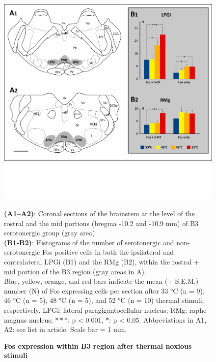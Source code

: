 \documentclass[a4paper,12pt,twoside]{report}
\begin{document}
\begin{figure}[p]

\begin{center}
 \includegraphics[width=18cm]{Article2-FIG2.jpg} 
\end{center}

\caption{\textbf{Fos expression within B3 region after thermal noxious stimuli}}

{\protect\parbox[t]{18cm}{
\begin{small}
\textbf{(A1–A2)}: Coronal sections of the brainstem at the level of the rostral and the mid portions (bregma -10.2 and -10.9 mm) of B3 serotonergic group (gray area). \\
\textbf{(B1-B2)}: Histograms of the number of serotonergic and non-serotonergic Fos positive cells in both the ipsilateral and contralateral LPGi (B1) and the RMg (B2), within the rostral + mid portion of the B3 region (gray areas in A). \\
Blue, yellow, orange, and red bars indicate the mean (+ S.E.M.) number (N) of Fos expressing cells per section after 33 °C (n = 9), 46 °C (n = 5), 48 °C (n = 5), and 52 °C (n = 10) thermal stimuli, respectively. LPGi: lateral paragigantocellular nucleus; RMg: raphe magnus nucleus; $***$: p < 0.001, $*$: p < 0.05. Abbreviations in A1, A2: see list in article. Scale bar = 1 mm.
\end{small}}}

\label{Article2-FIG2}

\end{figure}
\end{document}
